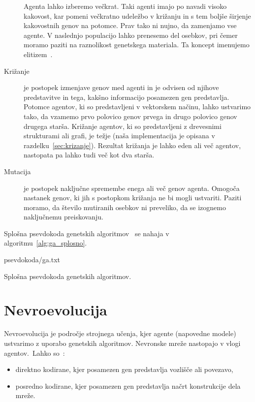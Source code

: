 \documentclass[a4paper,12pt,openright]{book}
\newcommand{\lstlistingslo}{}
\begin{document}
\begin{description}
{\begin{itemize}
            \end{itemize}
            Agenta lahko izberemo večkrat.
            Taki agenti imajo po navadi visoko kakovost, kar pomeni večkratno udeležbo v križanju in s tem boljše širjenje kakovostnih genov na potomce.
            Prav tako ni nujno, da zamenjamo vse agente. V naslednjo populacijo lahko prenesemo del osebkov, pri
            čemer moramo paziti na raznolikost genetskega materiala. Ta koncept imenujemo elitizem~\cite{inteligentni_sistemi_2010}.}
        \item[Križanje]{je postopek izmenjave genov med agenti in je odvisen od njihove predstavitve in tega, kakšno informacijo posamezen gen predstavlja.
            Potomce agentov, ki so predstavljeni v vektorskem načinu, lahko ustvarimo tako, da vzamemo prvo polovico genov prvega in drugo polovico genov
            drugega starša. Križanje agentov, ki so predstavljeni z drevesnimi strukturami ali grafi, je težje
            (naša implementacija je opisana v razdelku~\ref{sec:krizanje}).
            Rezultat križanja je lahko eden ali več agentov, nastopata pa lahko tudi več kot dva starša. }
        \item[Mutacija]{je postopek naključne spremembe enega ali več genov agenta. Omogoča nastanek genov, ki jih
            s postopkom križanja ne bi mogli ustvariti. Paziti moramo, da število mutiranih osebkov ni preveliko,
            da se izognemo naključnemu preiskovanju.}
    \end{description}

    Splošna psevdokoda genetskih algoritmov~\cite{inteligentni_sistemi_2010} se nahaja v algoritmu~\ref{alg:ga_splosno}.

    \begin{algorithm}
        \lstlistingslo{psevdokoda/ga.txt}
        \caption{Splošna psevdokoda genetskih algoritmov.}
        \label{alg:ga_splosno}
    \end{algorithm}


    \section{Nevroevolucija}\label{sec:nevroevolucija}
    Nevroevolucija je področje strojnega učenja, kjer agente (napovedne modele) ustvarimo z uporabo genetskih algoritmov.
    Nevronske mreže nastopajo v vlogi agentov.\ Lahko so~\cite{kassahun2007common}:
    \begin{itemize}
        \item direktno kodirane, kjer posamezen gen predstavlja vozlišče ali povezavo,
        \item posredno kodirane, kjer posamezen gen predstavlja načrt konstrukcije dela mreže.
    \end{itemize}
\end{document}
